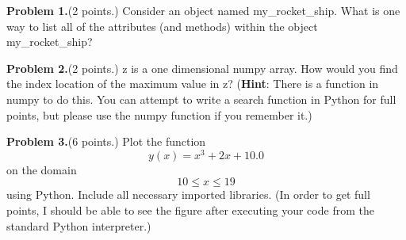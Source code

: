 \documentclass[12pt]{article}
\begin{document}
\bigskip

\bigskip


{\bf Problem 1.}(2 points.) Consider an object named my\_rocket\_ship. What is one way to list all of the attributes (and methods) within the object my\_rocket\_ship?

\bigskip
\bigskip
\bigskip


{\bf Problem 2.}(2 points.) z is a one dimensional numpy array. How would you find the index location of the maximum value in z? (\textbf{Hint}: There is a function in numpy to do this. You can attempt to write a search function in Python for full points, but please use the numpy function if you remember it.)
\bigskip
\bigskip
\bigskip
\bigskip
\bigskip
\bigskip
\bigskip
\bigskip
\bigskip
\bigskip
\bigskip


{\bf Problem 3.}(6 points.) Plot the function 
\begin{equation}
y(x) = x^3 + 2x + 10.0
\end{equation} on the domain \begin{equation}
10 \leq x \leq 19
\end{equation} using Python. Include all necessary imported libraries. (In order to get full points, I should be able to see the figure after executing your code from the standard Python interpreter.)

%
%
\end{document}
